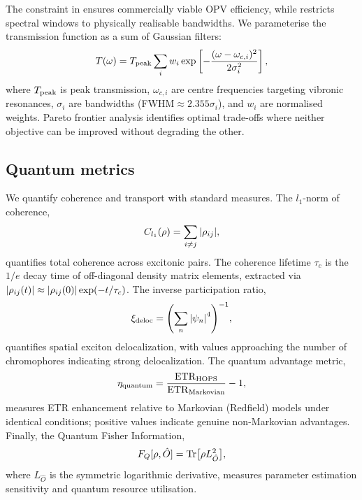 The constraint in  ensures commercially viable OPV efficiency, while  restricts spectral windows to physically realisable bandwidths. We parameterise the transmission function as a sum of Gaussian filters:
\begin{equation}\label{eq:transmission_function}
T(\omega) = T_{\rm peak} \sum_i w_i \exp\left[-\frac{(\omega - \omega_{c,i})^2}{2\sigma_i^2}\right],
\end{equation}
where $T_{\rm peak}$ is peak transmission, $\omega_{c,i}$ are centre frequencies targeting vibronic resonances, $\sigma_i$ are bandwidths (FWHM$\approx 2.355\sigma_i$), and $w_i$ are normalised weights. Pareto frontier analysis identifies optimal trade-offs where neither objective can be improved without degrading the other.

\subsection{Quantum metrics}

We quantify coherence and transport with standard measures. The $l_1$-norm of coherence,
\begin{equation}\label{eq:l1_coherence}
C_{l_1}(\rho) = \sum_{i \neq j} \abs{\rho_{ij}},
\end{equation}
quantifies total coherence across excitonic pairs. The coherence lifetime $\tau_c$ is the $1/e$ decay time of off-diagonal density matrix elements, extracted via $\abs{\rho_{ij}(t)} \approx \abs{\rho_{ij}(0)} \exp(-t/\tau_c)$. The inverse participation ratio,
\begin{equation}\label{eq:IPR}
\xi_{\rm deloc} = \qty( \sum_n \abs{\psi_n}^4 )^{-1},
\end{equation}
quantifies spatial exciton delocalization, with values approaching the number of chromophores indicating strong delocalization. The quantum advantage metric,
\begin{equation}\label{eq:quantum_advantage}
\eta_{\rm quantum} = \frac{\mathrm{ETR}_{\rm HOPS}}{\mathrm{ETR}_{\rm Markovian}} - 1,
\end{equation}
measures ETR enhancement relative to Markovian (Redfield) models under identical conditions; positive values indicate genuine non-Markovian advantages. Finally, the Quantum Fisher Information,
\begin{equation}\label{eq:QFI}
F_Q[\rho, \hat{O}] = \Tr[\rho L_{\hat{O}}^2],
\end{equation}
where $L_{\hat{O}}$ is the symmetric logarithmic derivative, measures parameter estimation sensitivity and quantum resource utilisation.

